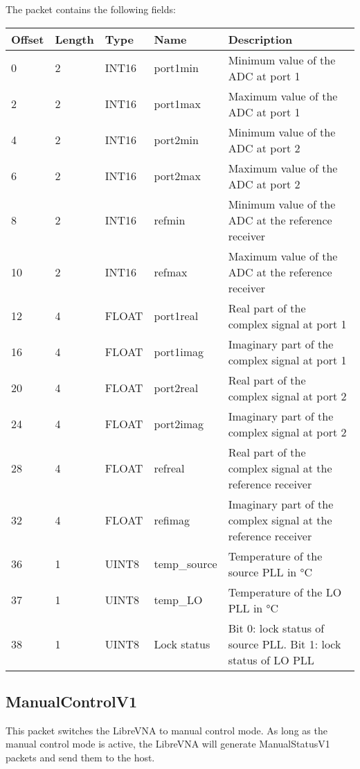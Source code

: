 \documentclass[a4paper,11pt]{article}
\begin{document}
The packet contains the following fields:
\begin{ThreePartTable}
\setlength\tabcolsep{3pt}

\begin{longtable}{p{} |  p{}  |  p{}| p{} | p{}}
\toprule
\textbf{Offset} &\textbf{Length} &\textbf{Type} & \textbf{Name} &\textbf{Description} \\ 
\hline
\endhead
\midrule[\heavyrulewidth]
\endfoot  
\midrule[\heavyrulewidth]
\endlastfoot

0 & 2 & INT16 & port1min & Minimum value of the ADC at port 1 \\
2 & 2 & INT16 & port1max & Maximum value of the ADC at port 1 \\
4 & 2 & INT16 & port2min & Minimum value of the ADC at port 2 \\
6 & 2 & INT16 & port2max & Maximum value of the ADC at port 2 \\
8 & 2 & INT16 & refmin & Minimum value of the ADC at the reference receiver \\
10 & 2 & INT16 & refmax & Maximum value of the ADC at the reference receiver \\
12 & 4 & FLOAT & port1real & Real part of the complex signal at port 1 \\
16 & 4 & FLOAT & port1imag & Imaginary part of the complex signal at port 1 \\
20 & 4 & FLOAT & port2real & Real part of the complex signal at port 2 \\
24 & 4 & FLOAT & port2imag & Imaginary part of the complex signal at port 2 \\
28 & 4 & FLOAT & refreal & Real part of the complex signal at the reference receiver \\
32 & 4 & FLOAT & refimag & Imaginary part of the complex signal at the reference receiver \\
36 & 1 & UINT8 & temp\_source & Temperature of the source PLL in \si{\celsius} \\
37 & 1 & UINT8 & temp\_LO & Temperature of the LO PLL in \si{\celsius} \\
38 & 1 & UINT8 & Lock status & Bit 0: lock status of source PLL. Bit 1: lock status of LO PLL \\
\end{longtable}   
\end{ThreePartTable}

\subsection{ManualControlV1}
This packet switches the LibreVNA to manual control mode. As long as the manual control mode is active, the LibreVNA will generate ManualStatusV1 packets and send them to the host.
\end{document}
